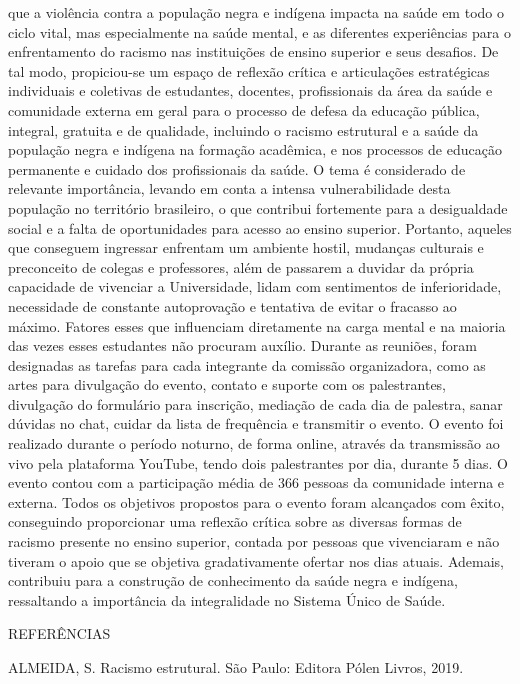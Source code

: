 que a violência contra a população negra e indígena impacta na saúde em todo o ciclo vital, mas especialmente na saúde mental, e as diferentes experiências para o enfrentamento do racismo nas instituições de ensino superior e seus desafios. De tal modo, propiciou-se um espaço de reflexão crítica e articulações estratégicas individuais e coletivas de estudantes, docentes, profissionais da área da saúde e comunidade externa em geral para o processo de defesa da educação pública, integral, gratuita e
de qualidade, incluindo o racismo estrutural e a saúde da população negra e indígena na formação acadêmica, e nos processos de educação permanente e cuidado dos profissionais da saúde. O tema é considerado de relevante importância, levando em conta a intensa vulnerabilidade desta população no território brasileiro, o que contribui fortemente para a desigualdade social e a falta de oportunidades para acesso ao ensino superior. Portanto, aqueles que conseguem ingressar enfrentam um ambiente hostil, mudanças culturais e preconceito de colegas e professores, além de passarem a duvidar da própria capacidade de vivenciar a Universidade, lidam com sentimentos de inferioridade, necessidade de constante autoprovação e tentativa de evitar o fracasso ao máximo. Fatores esses que influenciam diretamente na carga mental e na maioria das vezes esses estudantes não procuram auxílio. Durante as reuniões, foram designadas as tarefas para cada integrante da comissão organizadora, como as artes para divulgação do evento, contato e suporte com os palestrantes, divulgação do formulário para inscrição, mediação de cada dia de palestra, sanar dúvidas no chat, cuidar da lista de frequência e transmitir o evento. O evento foi realizado durante o período noturno, de forma online, através da transmissão ao vivo pela plataforma YouTube, tendo dois palestrantes por dia, durante 5 dias. O evento contou com a participação média de 366 pessoas da comunidade interna e externa. Todos os objetivos propostos para o evento foram alcançados com êxito, conseguindo proporcionar uma reflexão crítica sobre as diversas formas de racismo presente no ensino superior, contada por pessoas que vivenciaram e não tiveram o apoio que se objetiva gradativamente ofertar nos dias atuais. Ademais, contribuiu para a construção de conhecimento da saúde negra e indígena, ressaltando a importância da integralidade no Sistema Único de Saúde.

REFERÊNCIAS

ALMEIDA, S. Racismo estrutural. São Paulo: Editora Pólen Livros, 2019.

